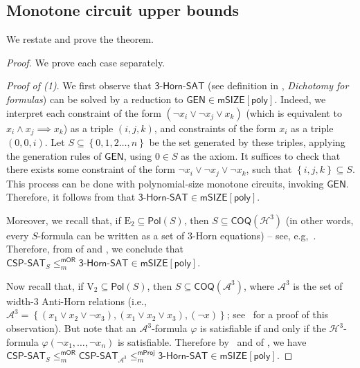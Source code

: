 \documentclass[10pt,a4paper]{article}
\newcommand{\poly}{\mathsf{poly}}
\newcommand{\complexityfont}[1]{\mathsf{#1}}
\newcommand{\monclass}[1]{\mathsf{m}#1}
\def\SIZE         {\complexityfont{SIZE}}
\def\mSIZE        {\monclass{\SIZE}}
\newcommand{\thornsat}{\mathsf{3\mbox{-}Horn\mbox{-}SAT}}
\newcommand{\hornt}{\calh^3}
\newcommand{\ahornt}{\cala^3}
\def\sseq{\subseteq}
\newcommand{\set}[1]{\left\{#1\right\}}
\newcommand{\GEN}{\mathsf{GEN}}
\newcommand{\CSPf}[1]{\mathsf{CSP}\text{-}\mathsf{SAT}_{#1}}
\newcommand{\COQ}{\mathsf{COQ}}
\newcommand{\Pol}{\mathsf{Pol}}
\newcommand{\mprojred}{\leq^{\mathsf{mProj}}_m}
\newcommand{\mormred}{\leq^{\mathsf{mOR}}_m}
\newcommand{\clonefont}[1]{\mathrm{#1}}
\def\cala{{\mathcal A}}
\def\calh{{\mathcal H}}
\begin{document}
\subsection{Monotone circuit upper bounds}
\label{sec:monotone_upper}





We restate and prove the theorem.

\monschaeffer*

\begin{proof}
    We prove each case separately.

    \emph{Proof of (1)}.
    We first observe that
    $\thornsat$ 
    (see definition in , \emph{Dichotomy for formulas})
    can be solved by a reduction to
    $\GEN \in \mSIZE[\poly]$.
    Indeed, we interpret each constraint of the form
    $(\neg x_i \lor \neg x_j \lor x_k)$
    (which is equivalent to 
    $x_i \land x_j \implies x_k$)
    as a triple
    $(i,j,k)$,
    and constraints of the form
    $x_i$
    as a triple
    $(0,0,i)$.
    Let $S \sseq \set{0,1,2\dots,n}$ be the set generated
    by these triples, applying the generation rules of $\GEN$,
    using $0 \in S$ as the axiom.
    It suffices to check that there exists
    some constraint of the form
    $\neg x_i \lor \neg x_j \lor \neg x_k$,
    such that $\set{i,j,k} \sseq S$.
    This process can be done with polynomial-size
    monotone circuits, invoking $\GEN$.
    Therefore, it follows
    from 
    that
    $\thornsat \in \mSIZE[\poly]$.

    Moreover, we recall that, if $\clonefont{E_2} \sseq \Pol(S)$, then
    $S \sseq \COQ(\hornt)$
    (in other words, every $S$-formula can be written as a set of 3-Horn
    equations) -- see, e.g,~\cite[Lemma 4.8]{DBLP:books/daglib/0004131}.
    Therefore, from 
     of 
    and
    ,
    we conclude that
    $\CSPf{S} \mormred \thornsat \in \mSIZE[\poly]$.

    Now recall that, if $\clonefont{V_2} \sseq \Pol(S)$,
    then
    $S \sseq \COQ(\ahornt)$,
    where
    $\ahornt$ is the set of width-3 Anti-Horn relations
    (i.e., $\ahornt = 
    \set{
        (x_1 \lor x_2 \lor \neg x_3),
        (x_1 \lor x_2 \lor x_3),
        (\neg x)
    }$; see~\cite[Lemma 4.8]{DBLP:books/daglib/0004131} for a proof of this
    observation).
    But note that an
    $\ahornt$-formula $\varphi$
    is satisfiable if and only if
    the $\hornt$-formula 
    $\varphi(\neg x_1,\dots,\neg x_n)$
    is satisfiable.
    Therefore by~
    and
     of ,
    we have
    $\CSPf{S} \mormred 
    \CSPf{\ahornt}
    \mprojred \thornsat \in \mSIZE[\poly]$.


\end{proof}
\end{document}
